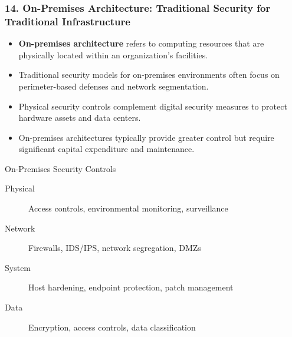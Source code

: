 \documentclass{beamer}
\begin{document}
	\begin{frame}
		\frametitle{14. On-Premises Architecture: Traditional Security for Traditional Infrastructure}
		\begin{itemize}
			\item \textbf{On-premises architecture} refers to computing resources that are physically located within an organization's facilities.
			\item Traditional security models for on-premises environments often focus on perimeter-based defenses and network segmentation.
			\item Physical security controls complement digital security measures to protect hardware assets and data centers.
			\item On-premises architectures typically provide greater control but require significant capital expenditure and maintenance.
		\end{itemize}
		
		\begin{block}{On-Premises Security Controls}
			\begin{description}
				\item[Physical] Access controls, environmental monitoring, surveillance
				\item[Network] Firewalls, IDS/IPS, network segregation, DMZs
				\item[System] Host hardening, endpoint protection, patch management
				\item[Data] Encryption, access controls, data classification
			\end{description}
		\end{block}
	\end{frame}
	
\end{document}
